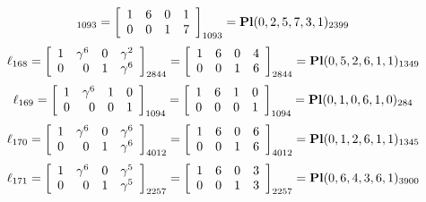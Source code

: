 \documentclass{article}
\begin{document}
{$$_{1093}
=
\left[
\begin{array}{*{4}c}
1  & 6  & 0  & 1\\
0  & 0  & 1  & 7\\
\end{array}
\right]_{1093}
={\rm\bf Pl}(0,2,5,7,3,1 )_{2399}$$
$$
\ell_{168} = 
\left[
\begin{array}{*{4}{r}}
1 & \gamma^{6} & 0 & \gamma^{2}\\
0 & 0 & 1 & \gamma^{6}\\
\end{array}
\right]
_{2844}
=
\left[
\begin{array}{*{4}c}
1  & 6  & 0  & 4\\
0  & 0  & 1  & 6\\
\end{array}
\right]_{2844}
={\rm\bf Pl}(0,5,2,6,1,1 )_{1349}$$
$$
\ell_{169} = 
\left[
\begin{array}{*{4}{r}}
1 & \gamma^{6} & 1 & 0\\
0 & 0 & 0 & 1\\
\end{array}
\right]
_{1094}
=
\left[
\begin{array}{*{4}c}
1  & 6  & 1  & 0\\
0  & 0  & 0  & 1\\
\end{array}
\right]_{1094}
={\rm\bf Pl}(0,1,0,6,1,0 )_{284}$$
$$
\ell_{170} = 
\left[
\begin{array}{*{4}{r}}
1 & \gamma^{6} & 0 & \gamma^{6}\\
0 & 0 & 1 & \gamma^{6}\\
\end{array}
\right]
_{4012}
=
\left[
\begin{array}{*{4}c}
1  & 6  & 0  & 6\\
0  & 0  & 1  & 6\\
\end{array}
\right]_{4012}
={\rm\bf Pl}(0,1,2,6,1,1 )_{1345}$$
$$
\ell_{171} = 
\left[
\begin{array}{*{4}{r}}
1 & \gamma^{6} & 0 & \gamma^{5}\\
0 & 0 & 1 & \gamma^{5}\\
\end{array}
\right]
_{2257}
=
\left[
\begin{array}{*{4}c}
1  & 6  & 0  & 3\\
0  & 0  & 1  & 3\\
\end{array}
\right]_{2257}
={\rm\bf Pl}(0,6,4,3,6,1 )_{3900}$$
}
\end{document}
